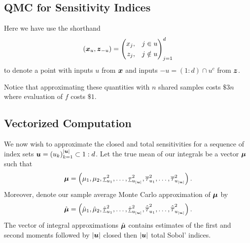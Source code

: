 \documentclass{article}[12pt]
\begin{document}
\subsection{QMC for Sensitivity Indices}

Here we have use the shorthand 
\begin{equation}
    (\boldsymbol{x}_{u},\boldsymbol{z}_{-u}) = \left(\begin{aligned}x_{j}, \quad & j \in u \\ z_{j}, \quad & j \notin u \end{aligned}\right)_{j=1}^d
\end{equation}
to denote a point with inputs $u$ from $\boldsymbol{x}$ and inputs $-u=(1:d)\cap u^c$ from $\boldsymbol{z}$. 

Notice that approximating these  quantities with $n$ shared samples costs $\$3n$ where evaluation of $f$ costs $\$1$.

\subsection{Vectorized Computation}

We now wish to approximate the closed and total sensitivities for a sequence of index sets $\boldsymbol{u} = \left(u_k\right)_{k=1}^{\lvert \boldsymbol{u} \rvert} \subset 1:d$. Let the true mean of our integrals be a vector $\boldsymbol{\mu}$ such that 
\begin{equation}
    \label{eq:bmu}
    \boldsymbol{\mu} = \left(\mu_1,\mu_2,\underline{\tau}_{u_1}^2,\dots,\underline{\tau}_{u_{\lvert \boldsymbol{u} \rvert}}^2,\overline{\tau}_{u_1}^2,\dots,\overline{\tau}_{u_{\lvert \boldsymbol{u} \rvert}}^2\right).
\end{equation}
Moreover, denote our sample average Monte Carlo approximation of $\boldsymbol{\mu}$ by
\begin{equation}
    \label{eq:bmu_hat}
    \hat{\boldsymbol{\mu}} = \left(\hat{\mu}_1,\hat{\mu}_2,\hat{\underline{\tau}}_{u_1}^2,\dots,\hat{\underline{\tau}}_{u_{\lvert \boldsymbol{u} \rvert}}^2,\hat{\overline{\tau}}_{u_1}^2,\dots,\hat{\overline{\tau}}_{u_{\lvert \boldsymbol{u} \rvert}}^2\right).
\end{equation}
The vector of integral approximations $\hat{\boldsymbol{\mu}}$ contains estimates of the first and second moments followed by $\lvert \boldsymbol{u} \rvert$ closed then $\lvert \boldsymbol{u} \rvert$ total Sobol' indices. 
\end{document}
